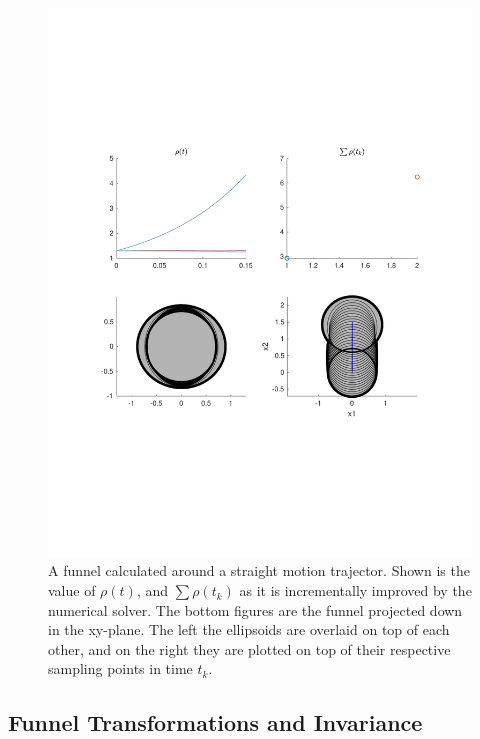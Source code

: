 \begin{figure}[!t]
  \centering \includegraphics[width=\linewidth, scale=.5, trim={0cm 6cm 0cm
    6cm}]{figures/method/funnel-calculation-visuals}
  \caption[A funnel calculated around a straight trajector]{A funnel calculated
    around a straight motion trajector. Shown is the value of \(\rho(t)\), and
    \(\sum \rho(t_k)\) as it is incrementally improved by the numerical solver.
    The bottom figures are the funnel projected down in the xy-plane. The left
    the ellipsoids are overlaid on top of each other, and on the right they are
    plotted on top of their respective sampling points in time \(t_k\).}
  \label{fig:funnel-calculation-visuals}
\end{figure}


\subsection{Funnel Transformations and Invariance}
\label{subsec:shifting-funnels}

